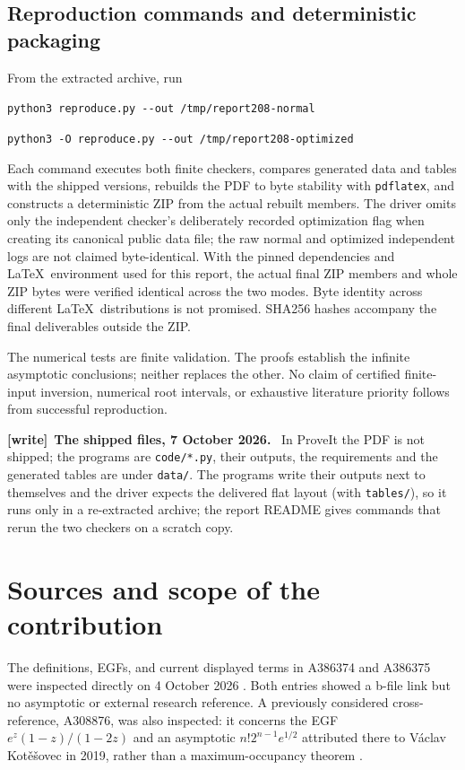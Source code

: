 \documentclass[11pt]{article}
\theoremstyle{remark}\newtheorem{remark}[theorem]{Remark}
\newcommand{\file}[1]{\nolinkurl{#1}}
\newenvironment{writenote}[1][]{\par\smallskip\begingroup\small
 \noindent\textbf{[write]}\if\relax\detokenize{#1}\relax\else~\textbf{#1.}\fi\ }%
 {\par\endgroup\smallskip}
\begin{document}
\subsection{Reproduction commands and deterministic packaging}
From the extracted archive, run
\begin{center}
\texttt{python3 reproduce.py -{}-out /tmp/report208-normal}\par
\texttt{python3 -O reproduce.py -{}-out /tmp/report208-optimized}
\end{center}
Each command executes both finite checkers, compares generated data and tables with the shipped versions, rebuilds the PDF to byte stability with \texttt{pdflatex}, and constructs a deterministic ZIP from the actual rebuilt members. The driver omits only the independent checker's deliberately recorded optimization flag when creating its canonical public data file; the raw normal and optimized independent logs are not claimed byte-identical. With the pinned dependencies and \LaTeX\ environment used for this report, the actual final ZIP members and whole ZIP bytes were verified identical across the two modes. Byte identity across different \LaTeX\ distributions is not promised. SHA256 hashes accompany the final deliverables outside the ZIP.

The numerical tests are finite validation. The proofs establish the infinite asymptotic conclusions; neither replaces the other. No claim of certified finite-input inversion, numerical root intervals, or exhaustive literature priority follows from successful reproduction.
\begin{writenote}[The shipped files, 7 October 2026]
In ProveIt the PDF is not shipped; the programs are \file{code/*.py}, their
outputs, the requirements and the generated tables are under \file{data/}.
The programs write their outputs next to themselves and the driver expects the
delivered flat layout (with \file{tables/}), so it runs only in a re-extracted
archive; the report README gives commands that rerun the two checkers on a
scratch copy.
\end{writenote}

\section{Sources and scope of the contribution}\label{fbm:sec:sources}
The definitions, EGFs, and current displayed terms in A386374 and A386375 were inspected directly on 4 October 2026 \cite{weak,strict}. Both entries showed a b-file link but no asymptotic or external research reference. A previously considered cross-reference, A308876, was also inspected: it concerns the EGF $e^z(1-z)/(1-2z)$ and an asymptotic $n!2^{n-1}e^{1/2}$ attributed there to V\'aclav Kot\v{e}\v{s}ovec in 2019, rather than a maximum-occupancy theorem \cite{unrelated}.
\end{document}
